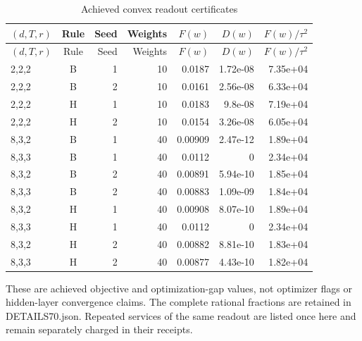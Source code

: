 \begingroup\small\setlength{\tabcolsep}{3pt}
\begin{longtable}{lcrrrrr}
\caption{Achieved convex readout certificates}\label{tab:training70}\\
\hline
$(d,T,r)$ & Rule & Seed & Weights & $F(w)$ & $D(w)$ & $F(w)/\tau^2$ \\
\hline\endfirsthead
\hline
$(d,T,r)$ & Rule & Seed & Weights & $F(w)$ & $D(w)$ & $F(w)/\tau^2$ \\
\hline\endhead
2,2,2 & B & 1 & 10 & 0.0187 & 1.72e-08 & 7.35e+04 \\
2,2,2 & B & 2 & 10 & 0.0161 & 2.56e-08 & 6.33e+04 \\
2,2,2 & H & 1 & 10 & 0.0183 & 9.8e-08 & 7.19e+04 \\
2,2,2 & H & 2 & 10 & 0.0154 & 3.26e-08 & 6.05e+04 \\
8,3,2 & B & 1 & 40 & 0.00909 & 2.47e-12 & 1.89e+04 \\
8,3,3 & B & 1 & 40 & 0.0112 & 0 & 2.34e+04 \\
8,3,2 & B & 2 & 40 & 0.00891 & 5.94e-10 & 1.85e+04 \\
8,3,3 & B & 2 & 40 & 0.00883 & 1.09e-09 & 1.84e+04 \\
8,3,2 & H & 1 & 40 & 0.00908 & 8.07e-10 & 1.89e+04 \\
8,3,3 & H & 1 & 40 & 0.0112 & 0 & 2.34e+04 \\
8,3,2 & H & 2 & 40 & 0.00882 & 8.81e-10 & 1.83e+04 \\
8,3,3 & H & 2 & 40 & 0.00877 & 4.43e-10 & 1.82e+04 \\
\hline
\end{longtable}\endgroup
{\footnotesize These are achieved objective and optimization-gap values, not optimizer flags or hidden-layer convergence claims. The complete rational fractions are retained in DETAILS70.json. Repeated services of the same readout are listed once here and remain separately charged in their receipts.}\par
